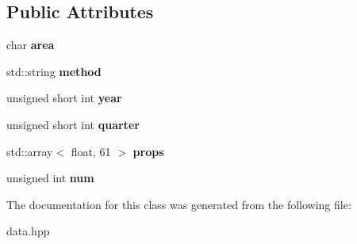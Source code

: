 \subsection*{Public Attributes}
\begin{DoxyCompactItemize}
\item 
\hypertarget{classIOSKJ_1_1Data_1_1SizeFrequency_a08b0a6bd3c85e65f42521048e6e3bab3}{char {\bfseries area}}\label{classIOSKJ_1_1Data_1_1SizeFrequency_a08b0a6bd3c85e65f42521048e6e3bab3}

\item 
\hypertarget{classIOSKJ_1_1Data_1_1SizeFrequency_a49c0a08a3422004645d2226265c237c7}{std\-::string {\bfseries method}}\label{classIOSKJ_1_1Data_1_1SizeFrequency_a49c0a08a3422004645d2226265c237c7}

\item 
\hypertarget{classIOSKJ_1_1Data_1_1SizeFrequency_a19ef92240e288f489c5d90b1c4df0000}{unsigned short int {\bfseries year}}\label{classIOSKJ_1_1Data_1_1SizeFrequency_a19ef92240e288f489c5d90b1c4df0000}

\item 
\hypertarget{classIOSKJ_1_1Data_1_1SizeFrequency_aee8e747384c06491bebb7cc539bbb15a}{unsigned short int {\bfseries quarter}}\label{classIOSKJ_1_1Data_1_1SizeFrequency_aee8e747384c06491bebb7cc539bbb15a}

\item 
\hypertarget{classIOSKJ_1_1Data_1_1SizeFrequency_ab9833e7a7783b8b73489ac83ad0d4bd8}{std\-::array$<$ float, 61 $>$ {\bfseries props}}\label{classIOSKJ_1_1Data_1_1SizeFrequency_ab9833e7a7783b8b73489ac83ad0d4bd8}

\item 
\hypertarget{classIOSKJ_1_1Data_1_1SizeFrequency_ad494b63b6b89bdedae41e62ce4dbc1d7}{unsigned int {\bfseries num}}\label{classIOSKJ_1_1Data_1_1SizeFrequency_ad494b63b6b89bdedae41e62ce4dbc1d7}

\end{DoxyCompactItemize}


The documentation for this class was generated from the following file\-:\begin{DoxyCompactItemize}
\item 
data.\-hpp\end{DoxyCompactItemize}
